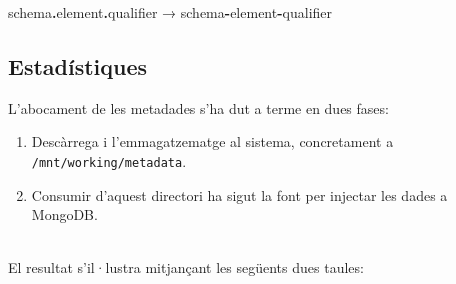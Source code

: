 \begin{center}
  schema\textbf{.}element\textbf{.}qualifier → schema\textbf{-}element\textbf{-}qualifier
\end{center}

\clearpage

\subsection{Estadístiques}\label{subsec:metadata-statistics}

L'abocament de les metadades s'ha dut a terme en dues fases:

\begin{enumerate}
  \item Descàrrega i l'emmagatzematge al sistema, concretament a \\ \texttt{/mnt/working/metadata}.
  \item Consumir d'aquest directori ha sigut la font per injectar les dades a MongoDB.
\end{enumerate}

\noindent \\
El resultat s'il·lustra mitjançant les següents dues taules: \\

